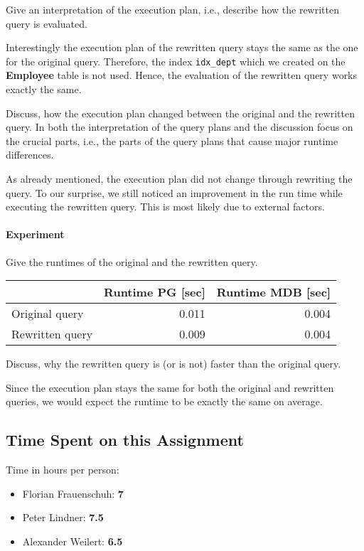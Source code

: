 \documentclass[11pt]{scrartcl}
\begin{document}
    Give an interpretation of the execution plan, i.e., describe how the rewritten query is evaluated.

    Interestingly the execution plan of the rewritten query stays the same as the one for the original query.
    Therefore, the index \texttt{idx\_dept} which we created on the \textbf{Employee} table is not used.
    Hence, the evaluation of the rewritten query works exactly the same.

    Discuss, how the execution plan changed between the original and the rewritten query.
    In both the interpretation of the query plans and the discussion focus on the crucial parts, i.e., the parts of the
    query plans that cause major runtime differences.

    As already mentioned, the execution plan did not change through rewriting the query.
    To our surprise, we still noticed an improvement in the run time while executing the rewritten query.
    This is most likely due to external factors.

    \paragraph{Experiment}

    Give the runtimes of the original and the rewritten query.

    \begin{table}[H]
        \centering
        \begin{tabular}{l|r|r}
            & Runtime PG [sec] & Runtime MDB [sec] \tabularnewline
            \hline
            Original query & 0.011 & 0.004 \tabularnewline
            Rewritten query & 0.009 & 0.004 \tabularnewline
        \end{tabular}
    \end{table}

    Discuss, why the rewritten query is (or is not) faster than the original query.

    Since the execution plan stays the same for both the original and rewritten queries, we would expect the runtime
    to be exactly the same on average.

    \subsection*{Time Spent on this Assignment}

    Time in hours per person:
    \begin{itemize}
        \item Florian Frauenschuh: \textbf{7}
        \item Peter Lindner: \textbf{7.5}
        \item Alexander Weilert: \textbf{6.5}
    \end{itemize}

    \pagebreak

    \printbibliography[title=References]
\end{document}
